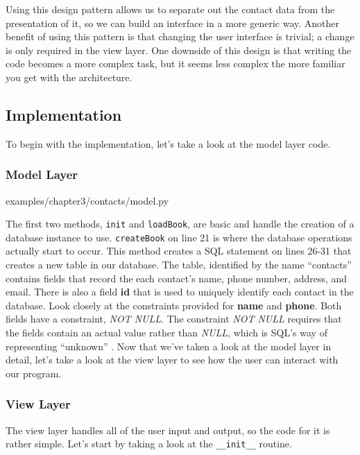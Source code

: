 \documentclass[12pt, oneside, a4paper]{book}
\begin{document}
      Using this design pattern allows us to separate out the contact data from the presentation of it, so we can build an interface in a more generic way.
      Another benefit of using this pattern is that changing the user interface is trivial; a change is only required in the view layer.
      One downside of this design is that writing the code becomes a more complex task, but it seems less complex the more familiar you get with the architecture.

      \subsection{Implementation}
      To begin with the implementation, let's take a look at the model layer code.

      \subsubsection{Model Layer}
      
      {examples/chapter3/contacts/model.py}

      The first two methods, \lstinline!init! and \lstinline!loadBook!, are basic and handle the creation of a database instance to use.
      \lstinline!createBook! on line 21 is where the database operations actually start to occur.
      This method creates a SQL statement on lines 26-31 that creates a new table in our database.
      The table, identified by the name ``contacts'' contains fields that record the each contact's name, phone number, address, and email.
      There is also a field \textbf{id} that is used to uniquely identify each contact in the database.
      Look closely at the constraints provided for \textbf{name} and \textbf{phone}.
      Both fields have a constraint, \textit{NOT NULL}.
      The constraint \textit{NOT NULL} requires that the fields contain an actual value rather than \textit{NULL}, which is SQL's way of representing ``unknown'' \autocite{SQLiteSyntaxColumnconstraint}.
      Now that we've taken a look at the model layer in detail, let's take a look at the view layer to see how the user can interact with our program.

      \subsubsection{View Layer}
      The view layer handles all of the user input and output, so the code for it is rather simple.
      Let's start by taking a look at the \lstinline!__init__! routine.
\end{document}
